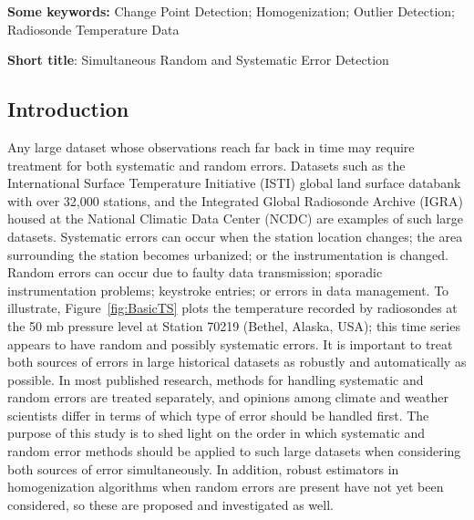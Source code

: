 \documentclass[12pt]{article}
\begin{document}

\begin{singlespacing}
\par\vfill\noindent
{\bf Some keywords:} Change Point Detection; Homogenization; Outlier Detection; Radiosonde Temperature Data

\par\medskip\noindent
{\bf Short title}:  Simultaneous Random and Systematic Error Detection

\end{singlespacing}
\clearpage\pagebreak\newpage {}
\begin{doublespacing}


\section{Introduction}



Any large dataset whose observations reach far back in time may require treatment for both systematic and random errors. Datasets such as the International Surface Temperature Initiative (ISTI) global land surface databank \cite{rennie14} with over 32,000 stations, and the Integrated Global Radiosonde Archive (IGRA) housed at the National Climatic Data Center (NCDC) \cite{durre06} are examples of such large datasets. Systematic errors can occur when the station location changes; the area surrounding the station becomes urbanized; or the instrumentation is changed. Random errors can occur due to faulty data transmission; sporadic instrumentation problems; keystroke entries; or errors in data management. To illustrate, Figure~\ref{fig:BasicTS} plots the temperature recorded by radiosondes at the 50 mb pressure level at Station 70219 (Bethel, Alaska, USA); this time series appears to have random and possibly systematic errors.  It is important to treat both sources of errors in  large historical datasets as robustly and automatically as possible. In most published research, methods for handling systematic and random errors are treated separately, and opinions among climate and weather scientists differ in terms of which type of error should be handled first. The purpose of this study is to shed light on the order in which systematic and random error methods should be applied to such large datasets when considering both sources of error simultaneously. In addition, robust estimators in homogenization algorithms when random errors are present have not yet been considered, so these are proposed and investigated as well.


\end{doublespacing}
\end{document}
